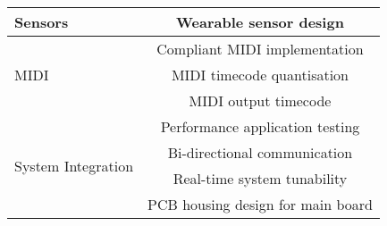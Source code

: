     \begin{tabular}{|l|c|}
        \hline
        Sensors                               & \cellcolor{orange!25}Wearable sensor design             \\ \hline \hline
        \multirow{3}{7em}{MIDI}               & \cellcolor{orange!25}Compliant MIDI implementation      \\ \cline{2-2}
        ~                                     & \cellcolor{orange!25}MIDI timecode quantisation         \\ \cline{2-2}
        ~                                     & \cellcolor{orange!25}MIDI output timecode               \\ \hline \hline
        \multirow{4}{7em}{System Integration} & \cellcolor{orange!25}Performance application testing    \\ \cline{2-2}
        ~                                     & \cellcolor{orange!25}Bi-directional communication       \\ \cline{2-2}
        ~                                     & \cellcolor{orange!25}Real-time system tunability        \\ \cline{2-2}
        ~                                     & \cellcolor{orange!25}PCB housing design for main board  \\ \hline
    \end{tabular}

